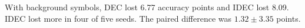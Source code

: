 With background symbols, DEC lost 6.77 accuracy points and IDEC lost 8.09. IDEC lost more in four of five seeds. The paired difference was $1.32\pm3.35$ points.

